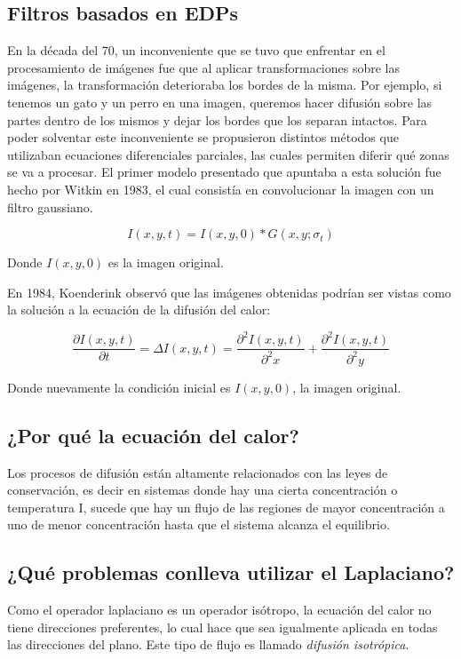\documentclass[assd_tpf_lineasinvest.tex]{subfiles}
\begin{document}
\subsection{Filtros basados en EDPs}
En la década del 70, un inconveniente que se tuvo que enfrentar en el procesamiento de imágenes fue que al aplicar transformaciones sobre las imágenes, la transformación deterioraba los bordes de la misma. Por ejemplo, si tenemos un gato y un perro en una imagen, queremos hacer difusión sobre las partes dentro de los mismos y dejar los bordes que los separan intactos. Para poder solventar este inconveniente se propusieron distintos métodos que utilizaban ecuaciones diferenciales parciales, las cuales permiten diferir qué zonas se va a procesar.
El primer modelo presentado que apuntaba a esta solución fue hecho por Witkin en 1983, el cual consistía en convolucionar la imagen con un filtro gaussiano.

\[ I(x,y,t) = I(x,y,0)*G(x,y;\sigma_t)  \]

Donde $I(x,y,0)$ es la imagen original.


En 1984, Koenderink observó que las imágenes obtenidas podrían ser vistas como la solución a la ecuación de la difusión del calor:

\[ \frac{\partial I(x,y,t)}{\partial t} = \Delta I(x,y,t)= \frac{\partial^2I(x,y,t)}{\partial^2x} + \frac{\partial^2I(x,y,t)}{\partial^2y}   \]

Donde nuevamente la condición inicial es $I(x,y,0)$, la imagen original.
\subsection{¿Por qué la ecuación del calor?}
Los procesos de difusión están altamente relacionados con las leyes de conservación, es decir en sistemas donde hay una cierta concentración o temperatura I, sucede que hay un flujo de las regiones de mayor concentración a uno de menor concentración hasta que el sistema alcanza el equilibrio.
\subsection{¿Qué problemas conlleva utilizar el Laplaciano?}
Como el operador laplaciano es un operador isótropo, la ecuación del calor no tiene direcciones preferentes, lo cual hace que sea igualmente aplicada en todas las direcciones del plano. Este tipo de flujo es llamado  \textit{difusión isotrópica}.
\end{document}
